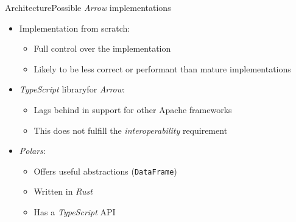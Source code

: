 \begin{frame}[t]{Architecture}{Possible \emph{Arrow} implementations}
	\begin{itemize}
		\item<1-> Implementation from scratch:
		      \begin{itemize}
			      \item Full control over the implementation
			      \item Likely to be less correct or performant than mature implementations
		      \end{itemize}
		\item<2-> \emph{TypeScript} library\footnotemark[1] for \emph{Arrow}:
		      \begin{itemize}
			      \item Lags behind in support for other Apache frameworks\footnotemark[2]
			      \item This does not fulfill the \emph{interoperability} requirement
		      \end{itemize}
		\item<3-> \emph{Polars}\footnotemark[3]:
		      \begin{itemize}
			      \item Offers useful abstractions (\Verb|DataFrame|)
			      \item Written in \emph{Rust}
			      \item Has a \emph{TypeScript} API
		      \end{itemize}
	\end{itemize}

\end{frame}

